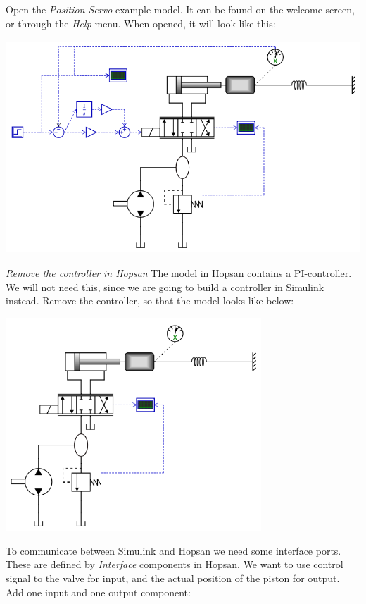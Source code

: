 \documentclass[a4paper]{article}
\begin{document}
\begin{enumerate}
Open the \textit{Position Servo} example model. It can be found on the welcome screen, or through the \textit{Help} menu. When opened, it will look like this:
 
\includegraphics[height=8cm]{gfx/simulink/model1.png}

\textit{Remove the controller in Hopsan}
The model in Hopsan contains a PI-controller. 
We will not need this, since we are going to build a controller in Simulink instead.  
Remove the controller, so that the model looks like below:

\includegraphics[height=8cm]{gfx/simulink/model2.png}

To communicate between Simulink and Hopsan we need some interface ports.
These are defined by \textit{Interface} components in Hopsan.
We want to use control signal to the valve for input, and the actual position of the piston for output.
Add one input and one output component:

\vspace{5pt}
\vspace{5pt}


\end{enumerate}
\end{document}
